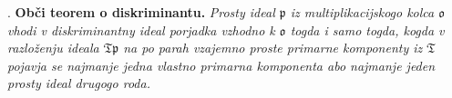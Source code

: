 \documentclass[11pt]{article}
\newcommand{\mo}{\mathfrak{o}}
\newcommand{\mT}{\mathfrak{T}}
\newcommand{\mpideal}{\mathfrak{p}}
\begin{document}
\setcounter{footnote}{39}

. \textbf{Obči teorem o diskriminantu.} \emph{Prosty ideal $\mpideal$ iz multiplikacijskogo kolca $\mo$ vhodi v diskriminantny ideal porjadka vzhodno k $\mo$ togda i samo togda, kogda v razloženju ideala $\mT\mpideal$ na po parah vzajemno proste primarne komponenty iz $\mT$ pojavja se najmanje jedna vlastno primarna komponenta abo najmanje jeden prosty ideal drugogo roda.}
\end{document}

